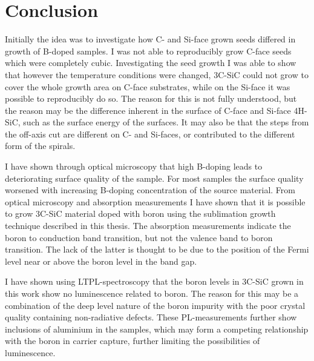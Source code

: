 
\chapter{Conclusion}
Initially the idea was to investigate how C- and Si-face grown seeds differed in growth of B-doped samples. I was not able to reproducibly grow C-face seeds which were completely cubic. Investigating the seed growth I was able to show that however the temperature conditions were changed, 3C-SiC could not grow to cover the whole growth area on C-face substrates, while on the Si-face it was possible to reproducibly do so. The reason for this is not fully understood, but the reason may be the difference inherent in the surface of C-face and Si-face 4H-SiC, such as the surface energy of the surfaces. It may also be that the steps from the off-axis cut are different on C- and Si-faces, or contributed to the different form of the spirals. 

I have shown through optical microscopy that high B-doping leads to deteriorating surface quality of the sample. For most samples the surface quality worsened with increasing B-doping concentration of the source material. From optical microscopy and absorption measurements I have shown that it is possible to grow 3C-SiC material doped with boron using the sublimation growth technique described in this thesis. The absorption measurements indicate the boron to conduction band transition, but not the valence band to boron transition. The lack of the latter is thought to be due to the position of the Fermi level near or above the boron level in the band gap. 

I have shown using LTPL-spectroscopy that the boron levels in 3C-SiC grown in this work show no luminescence related to boron. The reason for this may be a combination of the deep level nature of the boron impurity with the poor crystal quality containing non-radiative defects. These PL-measurements further show inclusions of aluminium in the samples, which may form a competing relationship with the boron in carrier capture, further limiting the possibilities of luminescence. 